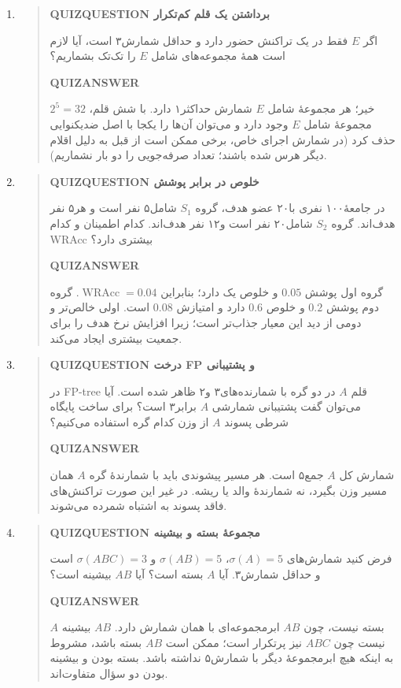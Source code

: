 \begin{enumerate}
\item\begin{quote}\textbf{QUIZQUESTION برداشتن یک قلم کم‌تکرار}\par 
اگر $E$ فقط در یک تراکنش حضور دارد و حداقل شمارش۳ است، آیا لازم است همهٔ مجموعه‌های شامل $E$ را تک‌تک بشماریم؟
\par\textbf{QUIZANSWER}\par خیر؛ هر مجموعهٔ شامل $E$ شمارش حداکثر۱ دارد. با شش قلم، $2^5=32$ مجموعهٔ شامل $E$ وجود دارد و می‌توان آن‌ها را یکجا با اصل ضدیکنوایی حذف کرد (در شمارش اجرای خاص، برخی ممکن است از قبل به دلیل اقلام دیگر هرس شده باشند؛ تعداد صرفه‌جویی را دو بار نشماریم).\par 
\end{quote}

\item\begin{quote}\textbf{QUIZQUESTION خلوص در برابر پوشش}\par 
در جامعهٔ۱۰۰ نفری با۲۰ عضو هدف، گروه $S_1$ شامل۵ نفر است و هر۵ نفر هدف‌اند. گروه $S_2$ شامل۲۰ نفر است و۱۲ نفر هدف‌اند. کدام اطمینان و کدام WRAcc بیشتری دارد؟
\par\textbf{QUIZANSWER}\par گروه اول پوشش $0.05$ و خلوص یک دارد؛ بنابراین $\operatorname{WRAcc}=0.04$. گروه دوم پوشش $0.2$ و خلوص $0.6$ دارد و امتیازش $0.08$ است. اولی خالص‌تر و دومی از دید این معیار جذاب‌تر است؛ زیرا افزایش نرخ هدف را برای جمعیت بیشتری ایجاد می‌کند.\par 
\end{quote}

\item\begin{quote}\textbf{QUIZQUESTION درخت FP و پشتیبانی}\par 
در FP-tree قلم $A$ در دو گره با شمارنده‌های۳ و۲ ظاهر شده است. آیا می‌توان گفت پشتیبانی شمارشی $A$ برابر۳ است؟ برای ساخت پایگاه شرطی پسوند $A$ از وزن کدام گره استفاده می‌کنیم؟
\par\textbf{QUIZANSWER}\par شمارش کل $A$ جمع۵ است. هر مسیر پیشوندی باید با شمارندهٔ گره $A$ همان مسیر وزن بگیرد، نه شمارندهٔ والد یا ریشه. در غیر این صورت تراکنش‌های فاقد پسوند به اشتباه شمرده می‌شوند.\par 
\end{quote}

\item\begin{quote}\textbf{QUIZQUESTION مجموعهٔ بسته و بیشینه}\par 
فرض کنید شمارش‌های $\sigma(A)=5$، $\sigma(AB)=5$ و $\sigma(ABC)=3$ است و حداقل شمارش۳. آیا $A$ بسته است؟ آیا $AB$ بیشینه است؟
\par\textbf{QUIZANSWER}\par $A$ بسته نیست، چون $AB$ ابرمجموعه‌ای با همان شمارش دارد. $AB$ بیشینه نیست چون $ABC$ نیز پرتکرار است؛ ممکن است $AB$ بسته باشد، مشروط به اینکه هیچ ابرمجموعهٔ دیگر با شمارش۵ نداشته باشد. بسته بودن و بیشینه بودن دو سؤال متفاوت‌اند.\par 
\end{quote}


\end{enumerate}

